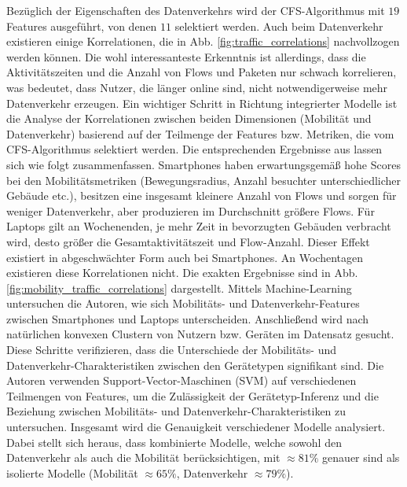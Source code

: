 \documentclass[12pt, a4paper]{article}
\begin{document}
Bezüglich der Eigenschaften des Datenverkehrs wird der \textsc{CFS}-Algorithmus mit $19$ Features ausgeführt, von denen $11$
selektiert werden. Auch beim Datenverkehr existieren einige Korrelationen, die in Abb. \ref{fig:traffic_correlations} nachvollzogen werden können.
Die wohl interessanteste Erkenntnis ist allerdings, dass die Aktivitätszeiten und die Anzahl von Flows und Paketen nur
schwach korrelieren, was bedeutet, dass Nutzer, die länger online sind, nicht notwendigerweise mehr Datenverkehr erzeugen. \cite{Alipour2018}
\newline\newline
Ein wichtiger Schritt in Richtung integrierter Modelle ist die Analyse der Korrelationen
zwischen beiden Dimensionen (Mobilität und Datenverkehr) basierend auf der Teilmenge der Features bzw. Metriken,
die vom \textsc{CFS}-Algorithmus selektiert werden. Die entsprechenden Ergebnisse aus \cite{Alipour2018} lassen sich wie 
folgt zusammenfassen. Smartphones haben erwartungsgemäß hohe Scores bei den Mobilitätsmetriken (Bewegungsradius,
Anzahl besuchter unterschiedlicher Gebäude etc.), besitzen eine
insgesamt kleinere Anzahl von Flows und sorgen für weniger Datenverkehr, aber produzieren im Durchschnitt größere Flows.
Für Laptops gilt an Wochenenden, je mehr Zeit in bevorzugten Gebäuden verbracht wird, desto größer die Gesamtaktivitätszeit
und Flow-Anzahl. Dieser Effekt existiert in abgeschwächter Form auch bei Smartphones. 
An Wochentagen existieren diese Korrelationen nicht. Die exakten Ergebnisse sind in Abb. \ref{fig:mobility_traffic_correlations}
dargestellt. Mittels Machine-Learning untersuchen die Autoren, wie sich Mobilitäts- und Datenverkehr-Features zwischen
Smartphones und Laptops unterscheiden. Anschließend wird nach natürlichen konvexen Clustern von Nutzern bzw. Geräten im
Datensatz gesucht. Diese Schritte verifizieren, dass die Unterschiede der Mobilitäts- und Datenverkehr-Charakteristiken
zwischen den Gerätetypen signifikant sind.\newline
Die Autoren verwenden Support-Vector-Maschinen (SVM) auf verschiedenen Teilmengen von Features, 
um die Zulässigkeit der Gerätetyp-Inferenz und die Beziehung zwischen Mobilitäts- und Datenverkehr-Charakteristiken
zu untersuchen. Insgesamt wird die Genauigkeit verschiedener Modelle analysiert. Dabei stellt sich heraus,
dass kombinierte Modelle, welche sowohl den Datenverkehr als auch die Mobilität berücksichtigen, 
mit $\approx 81 \%$ genauer sind als isolierte Modelle (Mobilität $\approx 65 \%$, Datenverkehr $\approx 79 \%$).
\end{document}
